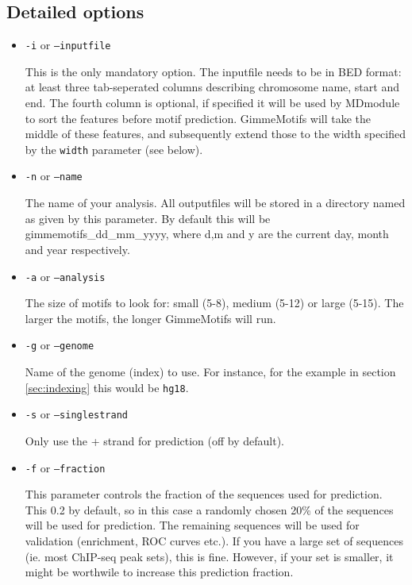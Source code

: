 \documentclass[10pt]{article}
\begin{document}
\subsection{Detailed options}
\begin{itemize}
\item 
\texttt{-i} or \texttt{--inputfile}

This is the only mandatory option. The inputfile needs to be in BED format: at least three tab-seperated columns describing chromosome name, start and end. The fourth column is optional, if specified it will be used by MDmodule to sort the features before motif prediction. GimmeMotifs will take the middle of these features, and subsequently extend those to the width specified by the \texttt{width} parameter (see below).

\item 
\texttt{-n} or \texttt{--name}

The name of your analysis. All outputfiles will be stored in a directory named as given by this parameter. By default this will be gimmemotifs\_dd\_mm\_yyyy, where d,m and y are the current day, month and year respectively.

\item 
\texttt{-a} or \texttt{--analysis}

The size of motifs to look for: small (5-8), medium (5-12) or large (5-15). The larger the motifs, the longer GimmeMotifs will run.

\item 
\texttt{-g} or \texttt{--genome}

Name of the genome (index) to use. For instance, for the example in section \ref{sec:indexing} this would be \texttt{hg18}.

\item 
\texttt{-s} or \texttt{--singlestrand}

Only use the + strand for prediction (off by default).

\item 
\texttt{-f} or \texttt{--fraction}

This parameter controls the fraction of the sequences used for prediction. This 0.2 by default, so in this case a randomly chosen 20\% of the sequences will be used for prediction. The remaining sequences will be used for validation (enrichment, ROC curves etc.). If you have a large set of sequences (ie. most ChIP-seq peak sets), this is fine. However, if your set is smaller, it might be worthwile to increase this prediction fraction.


\end{itemize}
\end{document}
